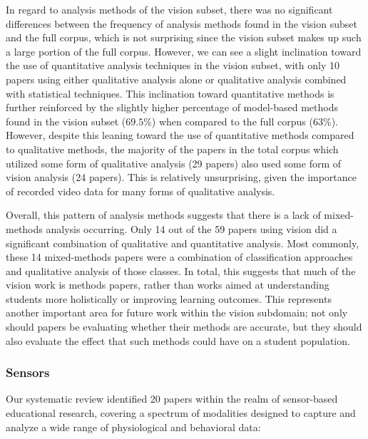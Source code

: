 \documentclass[manuscript,screen,review]{acmart}
\begin{document}
In regard to analysis methods of the vision subset, there was no significant differences between the frequency of analysis methods found in the vision subset and the full corpus, which is not surprising since the vision subset makes up such a large portion of the full corpus. However, we can see a slight inclination toward the use of quantitative analysis techniques in the vision subset, with only 10 papers using either qualitative analysis alone or qualitative analysis combined with statistical techniques. This inclination toward quantitative methods is further reinforced by the slightly higher percentage of model-based methods found in the vision subset ($69.5\%$) when compared to the full corpus ($63\%$). However, despite this leaning toward the use of quantitative methods compared to qualitative methods, the majority of the papers in the total corpus which utilized some form of qualitative analysis (29 papers) also used some form of vision analysis (24 papers). This is relatively unsurprising, given the importance of recorded video data for many forms of qualitative analysis.

Overall, this pattern of analysis methods suggests that there is a lack of mixed-methods analysis occurring. Only 14 out of the 59 papers using vision did a significant combination of qualitative and quantitative analysis. Most commonly, these 14 mixed-methods papers were a combination of classification approaches and qualitative analysis of those classes. In total, this suggests that much of the vision work is methods papers, rather than works aimed at understanding students more holistically or improving learning outcomes. This represents another important area for future work within the vision subdomain; not only should papers be evaluating whether their methods are accurate, but they should also evaluate the effect that such methods could have on a student population. 


    
\subsubsection{Sensors}


Our systematic review identified 20 papers within the realm of sensor-based educational research, covering a spectrum of modalities designed to capture and analyze a wide range of physiological and behavioral data:
\end{document}
